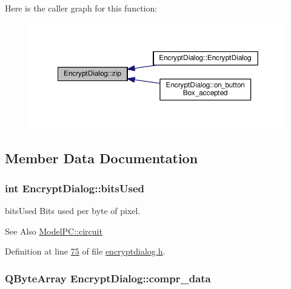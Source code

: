 Here is the caller graph for this function\-:
\nopagebreak
\begin{figure}[H]
\begin{center}
\leavevmode
\includegraphics[width=350pt]{class_encrypt_dialog_a2bff820a3df4ddc36ecb07ed74b7138a_icgraph}
\end{center}
\end{figure}




\subsection{Member Data Documentation}
\hypertarget{class_encrypt_dialog_abf638fea37fbdbaba215954e2e239860}{
\subsubsection[{bits\-Used}]{\setlength{\rightskip}{0pt plus 5cm}int Encrypt\-Dialog\-::bits\-Used}}\label{class_encrypt_dialog_abf638fea37fbdbaba215954e2e239860}


bits\-Used Bits used per byte of pixel. 

\begin{DoxySeeAlso}{See Also}
\hyperlink{class_model_p_c_a1d0091062a0c836b283ec2f67411623b}{Model\-P\-C\-::circuit} 
\end{DoxySeeAlso}


Definition at line \hyperlink{encryptdialog_8h_source_l00075}{75} of file \hyperlink{encryptdialog_8h_source}{encryptdialog.\-h}.

\hypertarget{class_encrypt_dialog_a3e8998aa39696cbd1242f6420ef18143}{
\subsubsection[{compr\-\_\-data}]{\setlength{\rightskip}{0pt plus 5cm}Q\-Byte\-Array Encrypt\-Dialog\-::compr\-\_\-data}}\label{class_encrypt_dialog_a3e8998aa39696cbd1242f6420ef18143}


